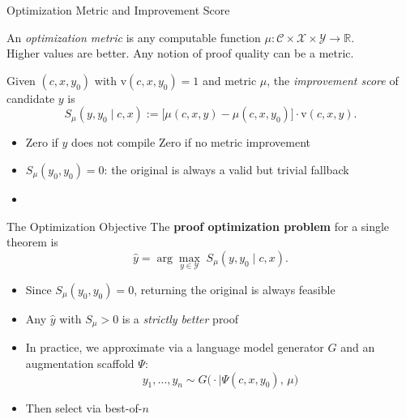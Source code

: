 \begin{frame}{Optimization Metric and Improvement Score}
\vspace{0.3em}
\begin{definition}
An \emph{optimization metric} is any computable function
$\mu : \mathcal{C} \times \mathcal{X} \times \mathcal{Y} \to \mathbb{R}$.\\[0.3em]
Higher values are better. Any notion of proof quality can be a metric.
\end{definition}
\vspace{0.4em}
\begin{definition}
Given $(c, x, y_0)$ with $\mathrm{v}(c,x,y_0)=1$ and metric $\mu$, the \emph{improvement score} of candidate $y$ is
\[
  S_\mu(y, y_0 \mid c, x) := \bigl[\mu(c,x,y) - \mu(c,x,y_0)\bigr] \cdot \mathrm{v}(c,x,y).
\]
\end{definition}
\vspace{0.3em}
\begin{itemize}\setlength{\itemsep}{4pt}
  \item Zero if $y$ does not compile \quad\textbullet\quad Zero if no metric improvement
  \item $S_\mu(y_0, y_0) = 0$: the original is always a valid but trivial fallback
  \item {}
\end{itemize}
\end{frame}

\begin{frame}{The Optimization Objective}
\vspace{0.5em}
The \textbf{proof optimization problem} for a single theorem is
\[
  \hat{y} = \arg\max_{y \in \mathcal{Y}}\; S_\mu(y, y_0 \mid c, x).
\]
\vspace{0.5em}
\begin{itemize}\setlength{\itemsep}{8pt}
  \item Since $S_\mu(y_0, y_0) = 0$, returning the original is always feasible
  \item Any $\hat{y}$ with $S_\mu > 0$ is a \emph{strictly better} proof
  \item In practice, we approximate via a language model generator $G$ and an augmentation scaffold $\Psi$:
    \[y_1,\dots,y_n \sim G\bigl(\cdot \mid \Psi(c,x,y_0),\, \mu\bigr)\]
  \item Then select via best-of-$n$
\end{itemize}
\end{frame}

